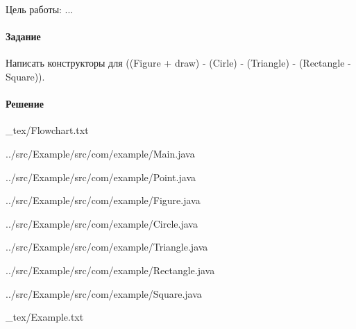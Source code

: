 Цель работы:
...

\paragraph{Задание} \hspace{0pt}

Написать конструкторы для ((Figure + draw) - (Cirle) - (Triangle) - (Rectangle - Square)).
    
\paragraph{Решение} \hspace{0pt}


{_tex/Flowchart.txt}


{../src/Example/src/com/example/Main.java}


{../src/Example/src/com/example/Point.java}


{../src/Example/src/com/example/Figure.java}


{../src/Example/src/com/example/Circle.java}


{../src/Example/src/com/example/Triangle.java}


{../src/Example/src/com/example/Rectangle.java}


{../src/Example/src/com/example/Square.java}

\newpage


{_tex/Example.txt}
